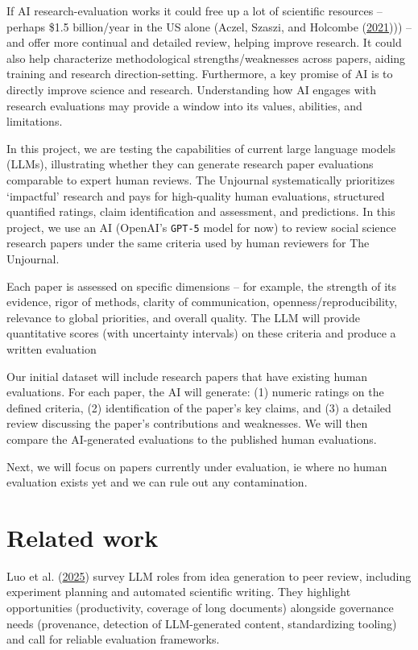 \documentclass[
  11pt,
  letterpaper,
  DIV=11,
  numbers=noendperiod]{scrreprt}
\begin{document}
If AI research-evaluation works it could free up a lot of scientific
resources -- perhaps \$1.5 billion/year in the US alone (Aczel, Szaszi,
and Holcombe (\protect\hyperlink{ref-aczel2021billion}{2021}))) -- and
offer more continual and detailed review, helping improve research. It
could also help characterize methodological strengths/weaknesses across
papers, aiding training and research direction-setting. Furthermore, a
key promise of AI is to directly improve science and research.
Understanding how AI engages with research evaluations may provide a
window into its values, abilities, and limitations.

In this project, we are testing the capabilities of current large
language models (LLMs), illustrating whether they can generate research
paper evaluations comparable to expert human reviews. The Unjournal
systematically prioritizes `impactful' research and pays for
high-quality human evaluations, structured quantified ratings, claim
identification and assessment, and predictions. In this project, we use
an AI (OpenAI's \texttt{GPT-5} model for now) to review social science
research papers under the same criteria used by human reviewers for The
Unjournal.

Each paper is assessed on specific dimensions -- for example, the
strength of its evidence, rigor of methods, clarity of communication,
openness/reproducibility, relevance to global priorities, and overall
quality. The LLM will provide quantitative scores (with uncertainty
intervals) on these criteria and produce a written evaluation

Our initial dataset will include research papers that have existing
human evaluations. For each paper, the AI will generate: (1) numeric
ratings on the defined criteria, (2) identification of the paper's key
claims, and (3) a detailed review discussing the paper's contributions
and weaknesses. We will then compare the AI-generated evaluations to the
published human evaluations.

Next, we will focus on papers currently under evaluation, ie where no
human evaluation exists yet and we can rule out any contamination.

\hypertarget{related-work}{%
\section{Related work}\label{related-work}}

Luo et al. (\protect\hyperlink{ref-Luo2025}{2025}) survey LLM roles from
idea generation to peer review, including experiment planning and
automated scientific writing. They highlight opportunities
(productivity, coverage of long documents) alongside governance needs
(provenance, detection of LLM-generated content, standardizing tooling)
and call for reliable evaluation frameworks.
\end{document}
